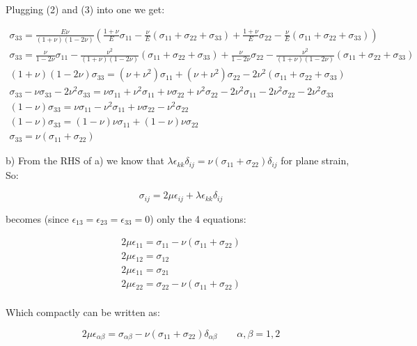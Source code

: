 \documentclass{article}
\begin{document}
Plugging (2) and (3) into one we get:

\begin{gather*}
  \sigma_{33} = \frac{E\nu}{(1+\nu)(1-2\nu)}(\frac{1+\nu}{E}\sigma_{11} - \frac{\nu}{E}(\sigma_{11} + \sigma_{22} + \sigma_{33}) +  \frac{1+\nu}{E}\sigma_{22} - \frac{\nu}{E}(\sigma_{11} + \sigma_{22} + \sigma_{33}))\\
  \sigma_{33} = \frac{\nu}{1 - 2\nu}\sigma_{11} - \frac{\nu^2}{(1+\nu)(1-2\nu)}(\sigma_{11} + \sigma_{22} + \sigma_{33}) + \frac{\nu}{1 - 2\nu}\sigma_{22} - \frac{\nu^2}{(1+\nu)(1-2\nu)}(\sigma_{11} + \sigma_{22} + \sigma_{33})\\
  (1+\nu)(1-2\nu)\sigma_{33} = (\nu + \nu^2)\sigma_{11} + (\nu + \nu^2)\sigma_{22} - 2\nu^2(\sigma_{11} + \sigma_{22} + \sigma_{33})\\
  \sigma_{33} - \nu\sigma_{33} - 2\nu^2\sigma_{33} = \nu\sigma_{11} + \nu^2\sigma_{11} + \nu\sigma_{22} + \nu^2\sigma_{22} -2\nu^2\sigma_{11}  -2\nu^2\sigma_{22} -2\nu^2\sigma_{33}\\
  (1-\nu)\sigma_{33} = \nu\sigma_{11}- \nu^2\sigma_{11} +\nu\sigma_{22} - \nu^2\sigma_{22}\\
  (1-\nu)\sigma_{33} = (1-\nu)\nu\sigma_{11} + (1-\nu)\nu\sigma_{22}\\
  \sigma_{33} = \nu(\sigma_{11} + \sigma_{22})
\end{gather*}

\noindent b) From the RHS of a) we know that $\lambda \epsilon_{kk}\delta_{ij} = \nu(\sigma_{11} + \sigma_{22})\delta_{ij}$ for plane strain, So:

$$ \sigma_{ij} = 2\mu\epsilon_{ij} + \lambda\epsilon_{kk}\delta_{ij}$$

becomes (since $\epsilon_{13} = \epsilon_{23} = \epsilon_{33} = 0$) only the 4 equations:

\begin{gather*}
  2\mu\epsilon_{11} = \sigma_{11} - \nu(\sigma_{11} + \sigma_{22}) \\
  2\mu\epsilon_{12} = \sigma_{12} \\
  2\mu\epsilon_{11} = \sigma_{21} \\
   2\mu\epsilon_{22} = \sigma_{22} - \nu(\sigma_{11} + \sigma_{22})\\
\end{gather*}

Which compactly can be written as:

$$ 2\mu\epsilon_{\alpha\beta} = \sigma_{\alpha\beta} - \nu(\sigma_{11} + \sigma_{22})\delta_{\alpha\beta}\qquad \alpha, \beta = 1, 2 $$
\end{document}

